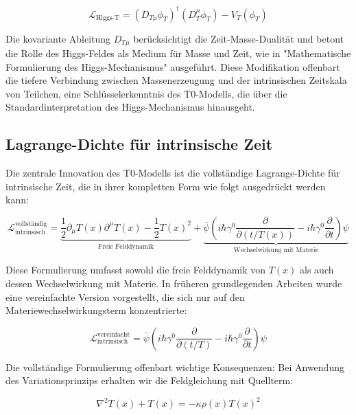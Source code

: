 \documentclass[a4paper,12pt]{article}
\newcommand{\Tfield}{T(x)}
\begin{document}
	\begin{equation}
		\mathcal{L}_\text{Higgs-T} = (D_{T\mu} \phi_T)^\dagger (D_T^\mu \phi_T) - V_T(\phi_T)
	\end{equation}
	
	Die kovariante Ableitung \(D_{T\mu}\) berücksichtigt die Zeit-Masse-Dualität und betont die Rolle des Higgs-Feldes als Medium für Masse und Zeit, wie in "Mathematische Formulierung des Higgs-Mechanismus" \cite{pascher_higgs_2025} ausgeführt. Diese Modifikation offenbart die tiefere Verbindung zwischen Massenerzeugung und der intrinsischen Zeitskala von Teilchen, eine Schlüsselerkenntnis des T0-Modells, die über die Standardinterpretation des Higgs-Mechanismus hinausgeht.
	\subsection{Lagrange-Dichte für intrinsische Zeit}
	
	Die zentrale Innovation des T0-Modells ist die vollständige Lagrange-Dichte für intrinsische Zeit, die in ihrer kompletten Form wie folgt ausgedrückt werden kann:
	
	\begin{equation}
		\mathcal{L}_{\text{intrinsisch}}^{\text{vollständig}} = \underbrace{\frac{1}{2} \partial_\mu \Tfield \partial^\mu \Tfield - \frac{1}{2}\Tfield^2}_{\text{Freie Felddynamik}} + \underbrace{\bar{\psi} \left( i\hbar \gamma^0 \frac{\partial}{\partial (t/\Tfield)} - i\hbar \gamma^0 \frac{\partial}{\partial t} \right) \psi}_{\text{Wechselwirkung mit Materie}}
	\end{equation}
	
	Diese Formulierung umfasst sowohl die freie Felddynamik von \(\Tfield\) als auch dessen Wechselwirkung mit Materie. In früheren grundlegenden Arbeiten wurde eine vereinfachte Version vorgestellt, die sich nur auf den Materiewechselwirkungsterm konzentrierte:
	
	\begin{equation}
		\mathcal{L}_\text{intrinsisch}^{\text{vereinfacht}} = \bar{\psi} \left( i\hbar \gamma^0 \frac{\partial}{\partial (t/T)} - i\hbar \gamma^0 \frac{\partial}{\partial t} \right) \psi
	\end{equation}
	
	Die vollständige Formulierung offenbart wichtige Konsequenzen: Bei Anwendung des Variationsprinzips erhalten wir die Feldgleichung mit Quellterm:
	
	\begin{equation}
		\nabla^2 \Tfield + \Tfield = -\kappa\rho(x)\Tfield^2
	\end{equation}
	
\end{document}
